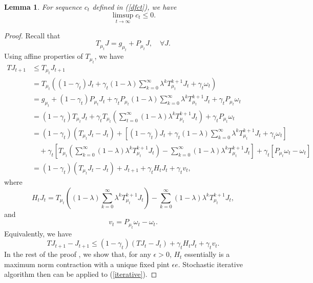 \documentclass[12pt,a4paper]{amsart}
\numberwithin{equation}{section}
\theoremstyle{plain}
\newtheorem{Lemma}[Th]{Lemma}
\theoremstyle{definition}
\begin{document}
\begin{Lemma} \label{lmct2}
	For sequence $c_t$ defined in (\ref{dfct}), we have 
	$$
	\limsup_{t \to \infty} c_t \leq 0.
	$$
\end{Lemma}
\begin{proof}
	Recall that
	$$
	T_{\mu_t} J = g_{\mu_t} + P_{\mu_t} J, \quad \forall J.
	$$
	Using affine properties of $T_{\mu_t}$, we have
	\begin{equation*}
		\begin{aligned}
		TJ_{t+1} & \le T_{\mu_t} J_{t+1} \\
		& = T_{\mu_t} \left( (1-\gamma_t) J_t + \gamma_t (1-\lambda) \sum_{k=0}^{\infty} \lambda^k T_{\mu_t}^{k+1} J_t + \gamma_t \omega_t \right) \\
		& = g_{\mu_t} + (1-\gamma_t) P_{\mu_t} J_t + \gamma_t P_{\mu_t} (1-\lambda) \sum_{k=0}^{\infty} \lambda^k T_{\mu_t}^{k+1} J_t + \gamma_t P_{\mu_t} \omega_t \\
		& = (1-\gamma_t) T_{\mu_t}J_t + \gamma_t T_{\mu_t} \left(\sum_{t=0}^{\infty} (1-\lambda)\lambda^k T_{\mu_t}^{k+1} J_t \right) + \gamma_t P_{\mu_t} \omega_t \\
		& = (1-\gamma_t) \left(T_{\mu_t} J_t - J_t \right) + \left[ (1-\gamma_t) J_t + \gamma_t (1-\lambda) \sum_{k=0}^{\infty} \lambda^k T_{\mu_t}^{k+1} J_t + \gamma_t \omega_t  \right] \\
		& \quad+ \gamma_t\left[T_{\mu_t} \left(\sum_{k=0}^{\infty} (1-\lambda) \lambda^k T_{\mu_t}^{k+1} J_t\right) -  \sum_{k=0}^{\infty} (1-\lambda) \lambda^k T_{\mu_t}^{k+1} J_t \right] +\gamma_t  \left[ P_{\mu_t}\omega_t - \omega_t \right] \\
		& = (1-\gamma_t) \left(T_{\mu_t}J_t - J_t\right) + J_{t+1} + \gamma_t H_t J_t + \gamma_t v_t,
		\end{aligned} 
	\end{equation*}
	where
	$$
	H_t J_t = T_{\mu_t} \left((1-\lambda)\sum_{k=0}^{\infty} \lambda^k T_{\mu_t}^{k+1} J_t\right) -  \sum_{k=0}^{\infty} (1-\lambda)\lambda^k T_{\mu_t}^{k+1} J_t, 
	$$
	and 
	$$
	v_t = P_{\mu_t} \omega_t - \omega_t. 
	$$
	Equivalently, we have
	\begin{equation}\label{iterative}
	TJ_{t+1} - J_{t+1} \le (1-\gamma_t) \left(TJ_t - J_t\right) + \gamma_t H_t J_t + \gamma_t v_t. 
	\end{equation}
	In the rest of the proof , we show that, for any $\epsilon > 0$,  $H_t$ essentially is a maximum norm contraction with a unique fixed pint $\epsilon e$. Stochastic iterative algorithm then can be applied to (\ref{iterative}). 
	

\end{proof}
\end{document}
